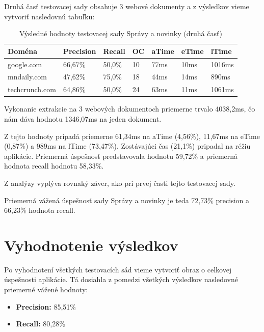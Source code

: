 Druhá časť testovacej sady obsahuje 3 webové dokumenty a z výsledkov vieme vytvoriť nasledovnú tabuľku:

\begin{table}[hbt]
\caption{Výsledné hodnoty testovacej sady Správy a novinky (druhá časť)}
\centering
\begin{tabular}{|l|l|l|l|l|l|l|}
\hline
Doména                  & Precision & Recall  & OC & aTime & eTime & lTime  \\ \hline
google.com              & 66,67\%   & 50,0\%  & 10 & 77ms  & 10ms  & 1016ms \\ \hline
mndaily.com             & 47,62\%   & 75,0\%  & 18 & 44ms  & 14ms  & 890ms  \\ \hline
techcrunch.com          & 64,86\%   & 50,0\%  & 24 & 63ms  & 11ms  & 1061ms \\ \hline
\end{tabular}
\end{table}

Vykonanie extrakcie na 3 webových dokumentoch priemerne trvalo 	4038,2ms, čo nám dáva hodnotu 1346,07ms na jeden dokument. 

Z tejto hodnoty pripadá priemerne 61,34ms na aTime (4,56\%), 11,67ms na eTime (0,87\%) a 989ms na lTime (73,47\%). Zostávajúci čas (21,1\%) pripadal na réžiu aplikácie. Priemerná úspešnosť predstavovala hodnotu 59,72\% a priemerná hodnota recall hodnotu 58,33\%. 

\bigskip

Z analýzy vyplýva rovnaký záver, ako pri prvej časti tejto testovacej sady. 

\bigskip

Priemerná vážená úspešnosť sady Správy a novinky je teda 72,73\% precision a 66,23\% hodnota recall.

\section{Vyhodnotenie výsledkov}

Po vyhodnotení všetkých testovacích sád vieme vytvoriť obraz o celkovej úspešnosti aplikácie. Tá dosiahla z pomedzi všetkých výsledkov nasledovné priemerné vážené hodnoty:

\begin{itemize}
    \item \textbf{Precision:} 85,51\%
    \item \textbf{Recall:} 80,28\%
\end{itemize}

